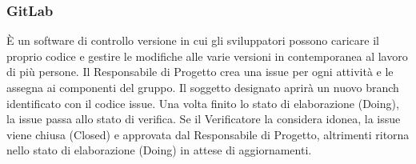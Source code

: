 \documentclass[11pt,a4paper]{article}
\begin{document}
\subsubsection{GitLab}
È un software di controllo versione in cui gli sviluppatori possono caricare il proprio codice e gestire le modifiche alle varie versioni in contemporanea al lavoro di più persone.
Il Responsabile di Progetto crea una issue per ogni attività e le assegna ai componenti del gruppo. Il soggetto designato aprirà un nuovo branch identificato con il codice issue.
Una volta finito lo stato di elaborazione (Doing), la issue passa allo stato di verifica. Se il Verificatore la considera idonea, la issue viene chiusa (Closed) e approvata dal Responsabile di Progetto, altrimenti ritorna nello stato di elaborazione (Doing) in attese di aggiornamenti.
\end{document}
